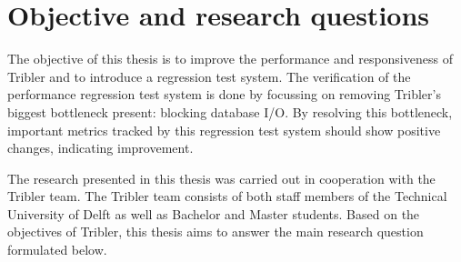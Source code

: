 


\section{Objective and research questions}
\label{chp2:sct:objectives-research-questions}
The objective of this thesis is to improve the performance and responsiveness of Tribler and to introduce a regression test system.
The verification of the performance regression test system is done by focussing on removing Tribler's biggest bottleneck present: blocking database I/O.
By resolving this bottleneck, important metrics tracked by this regression test system should show positive changes, indicating improvement.

The research presented in this thesis was carried out in cooperation with the Tribler team. 
The Tribler team consists of both staff members of the Technical University of Delft as well as Bachelor and Master students.
Based on the objectives of Tribler, this thesis aims to answer the main research question formulated below.\\

